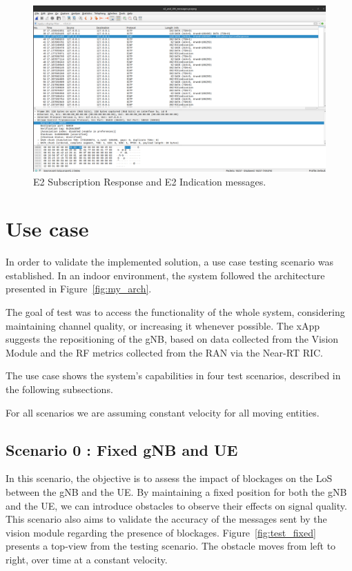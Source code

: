 \begin{figure}[H]
    \centering
    \includegraphics[width=0.5\linewidth]{figures/ric_subs}
    \caption{E2 Subscription Response and E2 Indication messages.}
    \label{fig:captura_e2ap}
\end{figure}

\section{Use case}\label{sec:use_case}
In order to validate the implemented solution, a use case testing scenario was established.
In an indoor environment, the system followed the architecture presented in Figure~\ref{fig:my_arch}.

The goal of test was to access the functionality of the whole system, considering maintaining channel quality, or increasing it whenever possible.
The xApp suggests the repositioning of the gNB, based on data collected from the Vision Module and the RF metrics collected from the RAN via the Near-RT RIC\@.

The use case shows the system's capabilities in four test scenarios, described in the following subsections.

For all scenarios we are assuming constant velocity for all moving entities.

\subsection{Scenario 0 : Fixed gNB and UE}\label{subsec:scenario-0-:-fixed-gnb-and-ue}

In this scenario, the objective is to assess the impact of blockages on the LoS between the gNB and the UE\@.
By maintaining a fixed position for both the gNB and the UE, we can introduce obstacles to observe their effects on signal quality.
This scenario also aims to validate the accuracy of the messages sent by the vision module regarding the presence of blockages.
Figure~\ref{fig:test_fixed} presents a top-view from the testing scenario.
The obstacle moves from left to right, over time at a constant velocity.


